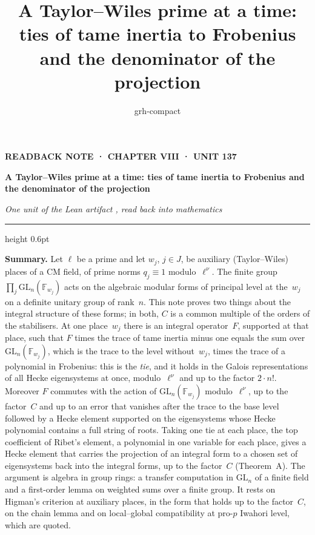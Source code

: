 \documentclass[11pt,a4paper]{article}
\title{A Taylor–Wiles prime at a time: ties of tame inertia to Frobenius and the denominator of the projection}
\author{grh-compact}
\date{}
\newcommand{\m}[1]{\mbox{$#1$}}        %
\theoremstyle{plainx}
\theoremstyle{uprightx}
\newcommand{\Fw}[1]{\mathbb{F}_{#1}}
\newcommand{\GL}{\mathrm{GL}}
\begin{document}
\color{ink}

{\raggedright
{\sffamily\bfseries\fontsize{7.2}{9}\selectfont\color{leancol}READBACK NOTE · CHAPTER VIII · UNIT 137\par}
\vspace{5pt}
{\fontsize{21.5}{25.5}\selectfont\bfseries A Taylor–Wiles prime at a time: ties of tame inertia to Frobenius and the
denominator of the projection\par}
\vspace{5pt}
{\fontsize{12.4}{16}\selectfont\itshape\color{inksoft} One unit of the Lean artifact \ArtifactName, read back into
mathematics\par}}
\vspace{8pt}
{\color{rulegrey}\hrule height 0.6pt}
\vspace{7pt}
\thispagestyle{empty}

\textbf{Summary.} Let $\ell$ be a prime and let $w_j$, \m{j\in J}, be auxiliary (Taylor--Wiles) places of a CM field,
of prime norms \m{q_j\equiv1} modulo~$\ell^\nu$. The finite group \m{\prod_{j}\GL_n(\Fw{w_j})} acts on the algebraic
modular forms of principal level at the~$w_j$ on a definite unitary group of rank~$n$. This note proves two things
about the integral structure of these forms; in both, $C$ is a common multiple of the orders of the stabilisers.
At one place~$w_j$ there is an integral operator~$F$, supported at that place, such that $F$ times the trace of
tame inertia minus one equals the sum over \m{\GL_n(\Fw{w_j})}, which is the trace to the level without~$w_j$,
times the trace of a polynomial in Frobenius: this is the \emph{tie}, and it holds in the Galois representations
of all Hecke eigensystems at once, modulo~$\ell^\nu$ and up to the factor \m{2\cdot n!}. Moreover $F$ commutes with
the action of \m{\GL_n(\Fw{w_j})} modulo~$\ell^\nu$, up to the factor~$C$ and up to an error that vanishes after
the trace to the base level followed by a Hecke element supported on the eigensystems whose Hecke polynomial
contains a full string of roots. Taking one tie at each place, the top coefficient of Ribet's element, a
polynomial in one variable for each place, gives a Hecke element that carries the projection of an integral form
to a chosen set of eigensystems back into the integral forms, up to the factor~$C$ (Theorem~A). The argument is algebra in group rings: a transfer computation in $\GL_n$ of a finite field and a
first-order lemma on weighted sums over a finite group. It rests on Higman's criterion at auxiliary places, in the form that holds up to the factor~$C$, on the
chain lemma and on local--global compatibility at pro-$p$ Iwahori level, which are quoted.
\end{document}
